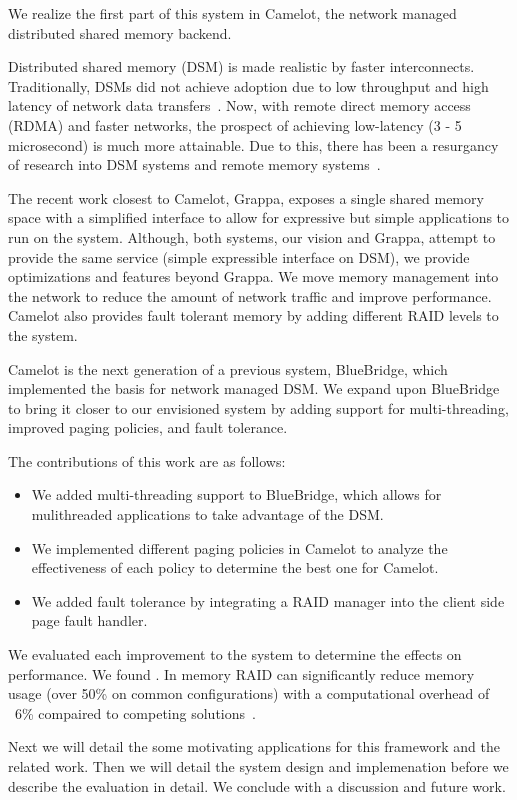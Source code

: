 We realize the first part of this system in Camelot, the network managed
distributed shared memory backend. 

Distributed shared memory (DSM) is made realistic by faster interconnects.
Traditionally, DSMs did not achieve adoption due to low throughput and high
latency of network data transfers~\cite{Li1989}. Now, with remote direct memory
access (RDMA) and faster networks, the prospect of achieving low-latency (3 - 5
microsecond) is much more attainable. Due to this, there has been a resurgancy
of research into DSM systems and remote memory systems~\cite{Ongaro2011,Nelson2015,Dragojevic2014}. 

The recent work closest to Camelot, Grappa, exposes a single shared memory
space with a simplified interface to allow for expressive but simple
applications to run on the system. Although, both systems, our vision and
Grappa, attempt to provide the same service (simple expressible interface on
DSM), we provide optimizations and features beyond Grappa. We move memory
management into the network to reduce the amount of network traffic and improve
performance. Camelot also provides fault tolerant memory by adding different
RAID levels to the system. 

Camelot is the next generation of a previous system, BlueBridge, which
implemented the basis for network managed DSM. We expand upon BlueBridge to
bring it closer to our envisioned system by adding support for multi-threading,
improved paging policies, and fault tolerance.

The contributions of this work are as follows:
\begin{itemize}
	\item We added multi-threading support to BlueBridge, which allows for
	mulithreaded applications to take advantage of the DSM.
	\item We implemented different paging policies in Camelot to analyze the
	effectiveness of each policy to determine the best one for Camelot.
	\item We added fault tolerance by integrating a RAID manager into the client side page fault handler.
        
\end{itemize}

We evaluated each improvement to the system to determine the effects on
performance. We found . In memory RAID can significantly reduce memory usage
(over 50\% on common configurations) with a computational overhead of ~6\%
compaired to competing solutions~\cite{Ousterhout:2015:RSS:2818727.2806887}.

Next we will detail the some motivating applications for this framework and the
related work. Then we will detail the system design and implemenation before we
describe the evaluation in detail. We conclude with a discussion and future
work.

